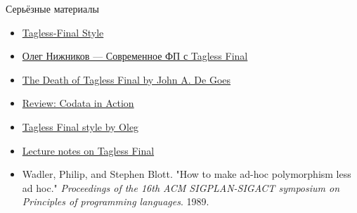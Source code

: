     \begin{frame}{Серьёзные материалы}
        \begin{itemize}
            \item \href{https://youtu.be/MbFqJ2NHS8M?si=LamIrSnrjbwCYrt2}{\color{blue}  Tagless-Final Style}
            \item \href{https://youtu.be/sWEtnq0ReZA?si=CxcESs7hoj73Kc7e}{\color{blue}  Олег Нижников — Современное ФП с Tagless Final}
            \item \href{https://youtu.be/p98W4bUtbO8?si=fU7dtXL3DnXEs75h}{\color{blue} The Death of Tagless Final by John A. De Goes}
            \item \href{https://reasonablypolymorphic.com/blog/review-codata/index.html}{\color{blue} Review: Codata in Action}
            \item \href{https://okmij.org/ftp/tagless-final/index.html}{\color{blue} Tagless Final style by Oleg}
            \item \href{https://okmij.org/ftp/tagless-final/course/lecture.pdf}{\color{blue} Lecture notes on Tagless Final}
            \item Wadler, Philip, and Stephen Blott. "How to make ad-hoc polymorphism less ad hoc." \textit{Proceedings of the 16th ACM SIGPLAN-SIGACT symposium on Principles of programming languages}. 1989.
        \end{itemize}
    \end{frame}


